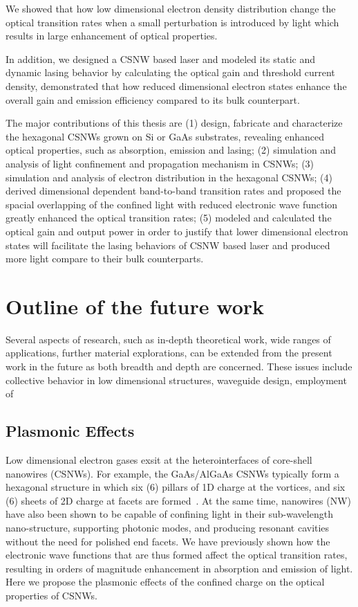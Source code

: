 We showed that how low dimensional electron density distribution change the
optical transition rates when a small perturbation is introduced by light which
results in large enhancement of optical properties.

In addition, we designed a CSNW based laser and modeled its static and dynamic
lasing behavior by calculating the optical gain and threshold current density,
demonstrated that how reduced dimensional electron states enhance the overall
gain and emission efficiency compared to its bulk counterpart.

The major contributions of this thesis are (1) design, fabricate and
characterize the hexagonal CSNWs grown on Si or GaAs substrates, revealing
enhanced optical properties, such as absorption, emission and lasing; (2)
simulation and analysis of light confinement and propagation mechanism in
CSNWs; (3) simulation and analysis of electron distribution in the hexagonal
CSNWs; (4) derived dimensional dependent band-to-band transition rates and
proposed the spacial overlapping of the confined light with reduced electronic
wave function greatly enhanced the optical transition rates; (5) modeled and
calculated the optical gain and output power in order to justify that lower
dimensional electron states will facilitate the lasing behaviors of CSNW based
laser and produced more light compare to their bulk counterparts.

\section{Outline of the future work}

Several aspects of research, such as in-depth theoretical work, wide ranges of
applications, further material explorations, can be extended from the present
work in the future as both breadth and depth are concerned. These issues
include collective behavior in low dimensional structures, waveguide design,
employment of 

\subsection{Plasmonic Effects}

Low dimensional electron gases exsit at the heterointerfaces of core-shell
nanowires (CSNWs). For example, the GaAs/AlGaAs CSNWs typically form a
hexagonal structure in which six (6) pillars of 1D charge at the vortices, and
six (6) sheets of 2D charge at facets  are formed~\cite{Wang:2015hz}. At the
same time, nanowires (NW) have also been shown to be capable of confining light
in their sub-wavelength nano-structure, supporting photonic modes, and
producing resonant cavities without the need for polished end facets. We have
previously shown how the electronic wave functions that are thus formed affect
the optical transition rates, resulting in orders of magnitude  enhancement in
absorption and emission of light. Here we propose the plasmonic effects of the
confined charge on the optical properties of CSNWs.

